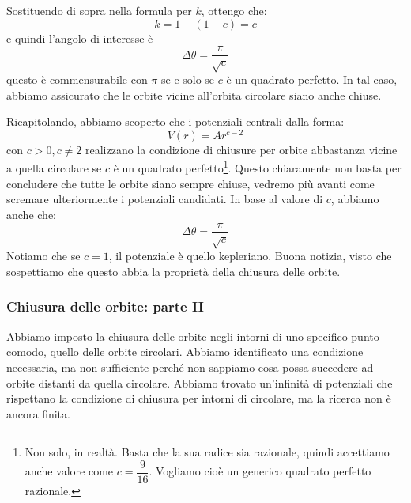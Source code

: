 \documentclass[a4paper,openany]{article}
\begin{document}
	Sostituendo di sopra nella formula per $k$, ottengo che:
	\begin{equation}\label{key}
		k = 1-(1-c) = c
	\end{equation}
	e quindi l'angolo di interesse è
	\begin{equation}\label{key}
		\Delta\theta = \dfrac{\pi}{\sqrt{c}}
	\end{equation}
	questo è commensurabile con $\pi$ se e solo se $c$ è un quadrato perfetto. In tal caso, abbiamo assicurato che le orbite vicine all'orbita circolare siano anche chiuse.
	
	
	
	Ricapitolando, abbiamo scoperto che i potenziali centrali dalla forma:
	\begin{equation}\label{key}
		V(r) = A r^{c-2}
	\end{equation}
	con $c>0, c\neq 2$ realizzano la condizione di chiusure per orbite abbastanza vicine a quella circolare se $c$ è un quadrato perfetto\footnote{Non solo, in realtà. Basta che la sua radice sia razionale, quindi accettiamo anche valore come $c = \dfrac{9}{16}$. Vogliamo cioè un generico quadrato perfetto razionale.}. Questo chiaramente non basta per concludere che tutte le orbite siano sempre chiuse, vedremo più avanti come scremare ulteriormente i potenziali candidati. In base al valore di $c$, abbiamo anche che:
	\begin{equation}\label{key}
		\Delta \theta = \dfrac{\pi}{\sqrt{c}}
	\end{equation}
	Notiamo che se $c=1$, il potenziale è quello kepleriano. Buona notizia, visto che sospettiamo che questo abbia la proprietà della chiusura delle orbite.
	\subsubsection{Chiusura delle orbite: parte II}
	Abbiamo imposto la chiusura delle orbite negli intorni di uno specifico punto comodo, quello delle orbite circolari. Abbiamo identificato una condizione necessaria, ma non sufficiente perché non sappiamo cosa possa succedere ad orbite distanti da quella circolare. Abbiamo trovato un'infinità di potenziali che rispettano la condizione di chiusura per intorni di circolare, ma la ricerca non è ancora finita.
	
\end{document}
